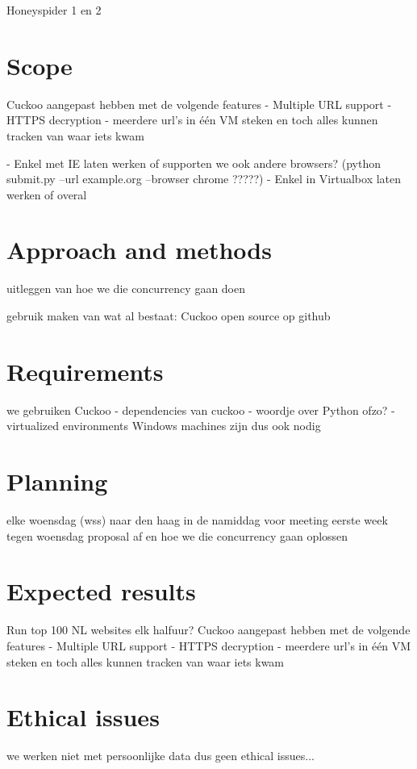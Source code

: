 \documentclass{scrartcl}
\begin{document}
Honeyspider 1 en 2

\section{Scope}

	Cuckoo aangepast hebben met de volgende features
		- Multiple URL support
		- HTTPS decryption
		- meerdere url's in één VM steken en toch alles kunnen tracken van waar iets kwam


 - Enkel met IE laten werken of supporten we ook andere browsers?
	(python submit.py --url example.org --browser chrome ?????)
 - Enkel in Virtualbox laten werken of overal


\section{Approach and methods}

uitleggen van hoe we die concurrency gaan doen

gebruik maken van wat al bestaat: Cuckoo
open source op github


\section{Requirements}

we gebruiken Cuckoo
	- dependencies van cuckoo
	- woordje over Python ofzo?
	- virtualized environments
Windows machines zijn dus ook nodig


\section{Planning}

elke woensdag (wss) naar den haag in de namiddag voor meeting
eerste week tegen woensdag proposal af en hoe we die concurrency gaan oplossen
 

\section{Expected results}
	Run top 100 NL websites elk halfuur?
	Cuckoo aangepast hebben met de volgende features
		- Multiple URL support
		- HTTPS decryption
		- meerdere url's in één VM steken en toch alles kunnen tracken van waar iets kwam

\section{Ethical issues}
	we werken niet met persoonlijke data dus geen ethical issues...



\end{document}
